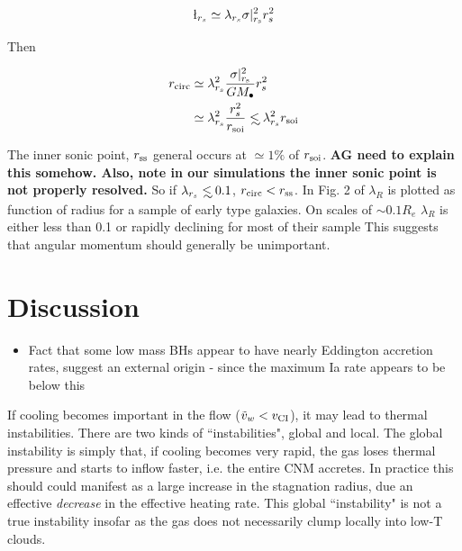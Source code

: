 \documentclass[usenatbib,fleqn]{mn2e}
\newcommand\lsim{\mathrel{\rlap{\lower4pt\hbox{\hskip1pt$\sim$}}
    \raise1pt\hbox{$<$}}}
\newcommand{\rs}{r_s}
\newcommand{\rcirc}{r_{\rm circ}}
\newcommand{\rss}{r_{\rm ss}}
\newcommand{\lrs}{\l_{\rs}}
\newcommand{\lambdars}{\lambda_{\rs}}
\newcommand{\Mbh}[1][]{M_{\bullet#1}}
\newcommand{\soi}{\rm soi}
\newcommand{\rsoi}{r_{\soi}}
\begin{document}
  \begin{align}
    \lrs\simeq\lambdars \sigma|_{r_{\rm s}}^2 \rs^2
  \end{align}

  Then

  \begin{align}
    \rcirc&\simeq\lambdars^2 \frac{\sigma|_{r_{\rm s}}^2}{G \Mbh} \rs^2\\
    &\simeq\lambdars^2 \frac{\rs^2}{\rsoi} \lsim \lambdars^2 \rsoi
  \end{align}

  The inner sonic point, $\rss$ general occurs at $\simeq 1\%$ of
  $\rsoi$. {\bf AG need to explain this somehow. Also, note in our
    simulations the inner sonic point is not properly resolved.}
  So if $\lambdars\lsim 0.1$, $\rcirc<\rss$. In Fig. 2 of
  \citet{EmsellemCappellari+:2007a} $\lambda_R$ is plotted as function
  of radius for a sample of early type galaxies. On scales of $\sim 0.1
  R_e$ $\lambda_R$ is either less than 0.1 or rapidly declining for most
  of their sample %
  This suggests that angular momentum should generally be unimportant.

\section{Discussion}

\begin{itemize}
\item{Fact that some low mass BHs appear to have nearly Eddington accretion rates, suggest an external origin - since the maximum Ia rate appears to be below this}
\end{itemize}

If cooling becomes important in the flow ($\tilde{v}_{w} < v_{\rm CI}$), it may lead to thermal instabilities.  There are two kinds of ``instabilities", global and local.  The global instability is simply that, if cooling becomes very rapid, the gas loses thermal pressure and starts to inflow faster, i.e. the entire CNM accretes.  In
practice this should could manifest as a large increase in the stagnation radius, due an effective {\it decrease} in the effective heating rate.  This global ``instability" is not a true instability insofar as the gas does not necessarily clump locally into low-T clouds.
\end{document}
